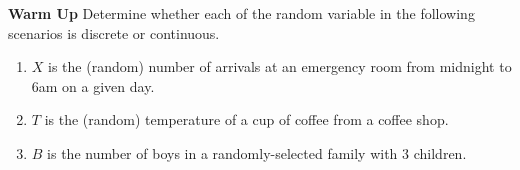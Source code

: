 \documentclass[10pt]{article}
\begin{document}
\newpage

\textbf{\color{blue} Warm Up} Determine whether each of the random variable in the following scenarios is discrete or continuous.

\begin{enumerate}[label=(\alph*)]
\item $X$ is the (random)  number of arrivals at an emergency room from midnight to 6am on a given day.

\vfill
\item $T$ is the (random)  temperature of a cup of coffee from a coffee shop.


\vfill 

\item $B$ is the number of boys in a randomly-selected family with 3 children.

\vfill
\end{enumerate}
\end{document}
